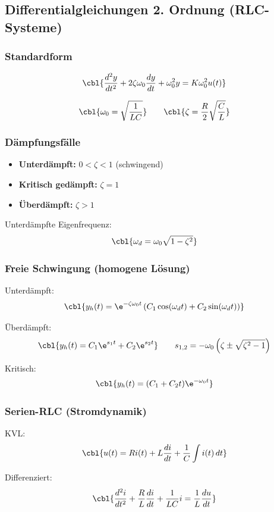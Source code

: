 \subsection{Differentialgleichungen 2. Ordnung (RLC-Systeme)}

\subsubsection{Standardform}

\[
\cbl{\frac{d^2y}{dt^2} + 2\zeta\omega_0 \frac{dy}{dt} + \omega_0^2 y = K \omega_0^2 u(t)}
\]

\[
\cbl{\omega_0 = \sqrt{\frac{1}{LC}}}
\qquad
\cbl{\zeta = \frac{R}{2}\sqrt{\frac{C}{L}}}
\]

\subsubsection{Dämpfungsfälle}

\begin{itemize}
    \item \textbf{Unterdämpft:} $0<\zeta<1$ (schwingend)
    \item \textbf{Kritisch gedämpft:} $\zeta=1$
    \item \textbf{Überdämpft:} $\zeta>1$
\end{itemize}

Unterdämpfte Eigenfrequenz:
\[
\cbl{\omega_d = \omega_0\sqrt{1-\zeta^2}}
\]

\subsubsection{Freie Schwingung (homogene Lösung)}

Unterdämpft:
\[
\cbl{y_h(t)=\e^{-\zeta\omega_0 t}\left(C_1\cos(\omega_d t)+C_2\sin(\omega_d t)\right)}
\]

Überdämpft:
\[
\cbl{y_h(t)=C_1\e^{s_1 t}+C_2\e^{s_2 t}}
\qquad
s_{1,2}=-\omega_0\left(\zeta\pm\sqrt{\zeta^2-1}\right)
\]

Kritisch:
\[
\cbl{y_h(t)=(C_1 + C_2 t)\e^{-\omega_0 t}}
\]

\subsubsection{Serien-RLC (Stromdynamik)}

KVL:
\[
\cbl{u(t)=Ri(t)+L\frac{di}{dt}+\frac{1}{C}\int i(t)\,dt}
\]

Differenziert:
\[
\cbl{\frac{d^2 i}{dt^2} + \frac{R}{L}\frac{di}{dt} + \frac{1}{LC}i = \frac{1}{L}\frac{du}{dt}}
\]

